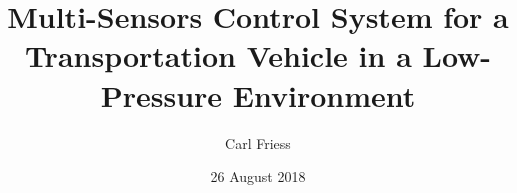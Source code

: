 \documentclass[%
 oneside,      %
 openany,      %
 halfparskip,  %
]{scrbook}
\title{Multi-Sensors Control System for a Transportation Vehicle in a Low-Pressure Environment}
\author{Carl Friess}
\date{26 August 2018}
\begin{document}
\dominitoc

\frontmatter




%


\tableofcontents
\listoffigures
\listoftables



\mainmatter







\appendix



\backmatter



\nocite*{} %


\end{document}
